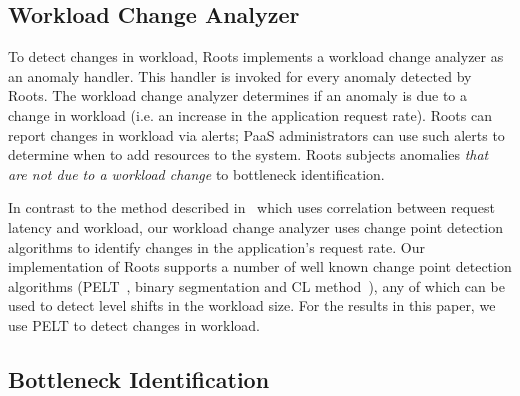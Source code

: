 
\subsection{Workload Change Analyzer}

To detect changes in workload, Roots implements a workload change analyzer as an anomaly handler. 
This handler is invoked for every anomaly detected by Roots.
The workload change analyzer determines if an anomaly is due to a change in workload (i.e.
an increase in the application request rate). Roots can report
changes in workload via alerts; PaaS administrators can use such alerts to determine when to
add resources to the system.
Roots subjects anomalies \textit{that are not due to a workload change} to bottleneck
identification.

In contrast to the method described 
in~\cite{Magalhaes:2010:DPA:1906485.1906774,
Magalhaes:2011:RAP:1982185.1982234} which uses correlation between request
latency and workload, our 
workload change analyzer uses change point detection algorithms to identify changes in
the application's request rate. 
Our implementation of Roots supports a number of well known change point
detection algorithms (PELT~\cite{doi:10.1080/01621459.2012.737745}, binary segmentation 
and CL method~\cite{chen1993joint}), any of which can be used to detect level shifts in the
workload size.  For the results in this paper, we use PELT to detect changes in workload.

\subsection{Bottleneck Identification}


